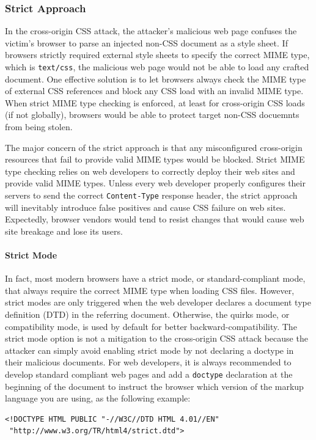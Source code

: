 \documentclass{acm_proc_article-sp}
\begin{document}
{\subsubsection{Strict Approach}
In the cross-origin CSS attack, the attacker's malicious web page confuses the victim's browser to parse an injected non-CSS document as a style sheet. If browsers strictly required external style sheets to specify the correct MIME type, which is \texttt{text/css}, the malicious web page would not be able to load any crafted document. One effective solution is to let browsers always check the MIME type of external CSS references and block any CSS load with an invalid MIME type. When strict MIME type checking is enforced, at least for cross-origin CSS loads (if not globally), browsers would be able to protect target non-CSS docuemnts from being stolen.

The major concern of the strict approach is that any misconfigured cross-origin resources that fail to provide valid MIME types would be blocked. Strict MIME type checking relies on web developers to correctly deploy their web sites and provide valid MIME types. Unless every web developer properly configures their servers to send the correct \texttt{Content-Type} response header, the strict approach will inevitably introduce false positives and cause CSS failure on web sites. Expectedly, browser vendors would tend to resist changes that would cause web site breakage and lose its users.

\paragraph{Strict Mode}
In fact, most modern browsers have a strict mode, or standard-compliant mode, that always require the correct MIME type when loading CSS files. However, strict modes are only triggered when the web developer declares a document type definition (DTD) in the referring document. Otherwise, the quirks mode, or compatibility mode, is used by default for better backward-compatibility. The strict mode option is not a mitigation to the cross-origin CSS attack because the attacker can simply avoid enabling strict mode by not declaring a doctype in their malicious documents. For web developers, it is always recommended to develop standard compliant web pages and add a \texttt{doctype} declaration at the beginning of the document to instruct the browser which version of the markup language you are using, as the following example:

\begin{verbatim}
<!DOCTYPE HTML PUBLIC "-//W3C//DTD HTML 4.01//EN"
 "http://www.w3.org/TR/html4/strict.dtd">
\end{verbatim}

}
\end{document}
